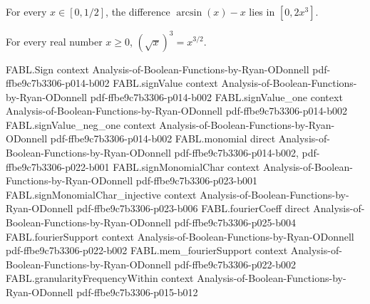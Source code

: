 \begin{theorem}
\label{FABL.arcsin_sub_self_mem_Icc_two_mul_cube}
\leanok
{}
For every $x\in[0,1/2]$, the difference $\arcsin(x)-x$ lies in $[0,2x^3]$.
\end{theorem}

\begin{theorem}
\label{FABL.sqrt_cube_eq_rpow_three_halves}
\leanok
{}
For every real number $x\ge 0$, $(\sqrt{x})^3=x^{3/2}$.
\end{theorem}

\begin{theorem}
\label{FABL.arccos_one_sub_two_mul_sub_two_mul_sqrt_isBigO}
\leanok
{}
\proofstep
  {FABL.Sign}
  {context}
  {Analysis-of-Boolean-Functions-by-Ryan-ODonnell}
  {pdf-ffbe9c7b3306-p014-b002}
\proofstep
  {FABL.signValue}
  {context}
  {Analysis-of-Boolean-Functions-by-Ryan-ODonnell}
  {pdf-ffbe9c7b3306-p014-b002}
\proofstep
  {FABL.signValue_one}
  {context}
  {Analysis-of-Boolean-Functions-by-Ryan-ODonnell}
  {pdf-ffbe9c7b3306-p014-b002}
\proofstep
  {FABL.signValue_neg_one}
  {context}
  {Analysis-of-Boolean-Functions-by-Ryan-ODonnell}
  {pdf-ffbe9c7b3306-p014-b002}
\proofstep
  {FABL.monomial}
  {direct}
  {Analysis-of-Boolean-Functions-by-Ryan-ODonnell}
  {pdf-ffbe9c7b3306-p014-b002,
    pdf-ffbe9c7b3306-p022-b001}
\proofstep
  {FABL.signMonomialChar}
  {context}
  {Analysis-of-Boolean-Functions-by-Ryan-ODonnell}
  {pdf-ffbe9c7b3306-p023-b001}
\proofstep
  {FABL.signMonomialChar_injective}
  {context}
  {Analysis-of-Boolean-Functions-by-Ryan-ODonnell}
  {pdf-ffbe9c7b3306-p023-b006}
\proofstep
  {FABL.fourierCoeff}
  {direct}
  {Analysis-of-Boolean-Functions-by-Ryan-ODonnell}
  {pdf-ffbe9c7b3306-p025-b004}
\proofstep
  {FABL.fourierSupport}
  {context}
  {Analysis-of-Boolean-Functions-by-Ryan-ODonnell}
  {pdf-ffbe9c7b3306-p022-b002}
\proofstep
  {FABL.mem_fourierSupport}
  {context}
  {Analysis-of-Boolean-Functions-by-Ryan-ODonnell}
  {pdf-ffbe9c7b3306-p022-b002}
\proofstep
  {FABL.granularityFrequencyWithin}
  {context}
  {Analysis-of-Boolean-Functions-by-Ryan-ODonnell}
  {pdf-ffbe9c7b3306-p015-b012}

\end{theorem}
